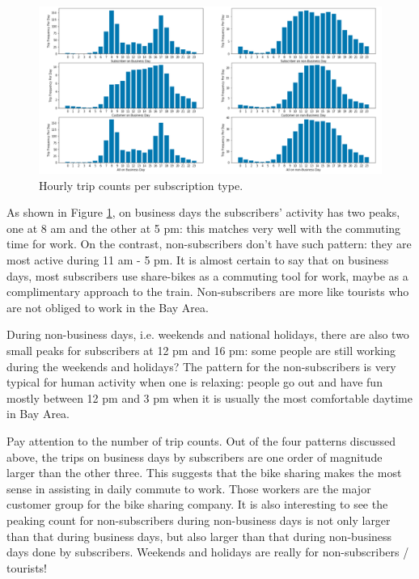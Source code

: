 \documentclass[a4paper]{article}
\begin{document}
			\begin{figure}
				\centering
				\includegraphics[width=1\textwidth]{HourlyTripsSubs.png}
				\caption{\label{fig:hourly_subs}Hourly trip counts per subscription type.}
			\end{figure}			
			
			As shown in Figure \ref{fig:hourly_subs}, on business days the subscribers' activity has two peaks, one at 8 am and the other at 5 pm: this matches very well with the commuting time for work. On the contrast, non-subscribers don't have such pattern: they are most active during 11 am - 5 pm. It is almost certain to say that on business days, most subscribers use share-bikes as a commuting tool for work, maybe as a complimentary approach to the train. Non-subscribers are more like tourists who are not obliged to work in the Bay Area. 
			
			During non-business days, i.e. weekends and national holidays, there are also two small peaks for subscribers at 12 pm and 16 pm: some people are still working during the weekends and holidays? The pattern for the non-subscribers is very typical for human activity when one is relaxing: people go out and have fun mostly between 12 pm and 3 pm when it is usually the most comfortable daytime in Bay Area.
			
			Pay attention to the number of trip counts. Out of the four patterns discussed above, the trips on business days by subscribers are one order of magnitude larger than the other three. This suggests that the bike sharing makes the most sense in assisting in daily commute to work. Those workers are the major customer group for the bike sharing company. It is also interesting to see the peaking count for non-subscribers during non-business days is not only larger than that during business days, but also larger than that during non-business days done by subscribers. Weekends and holidays are really for non-subscribers / tourists! 
			
\end{document}
